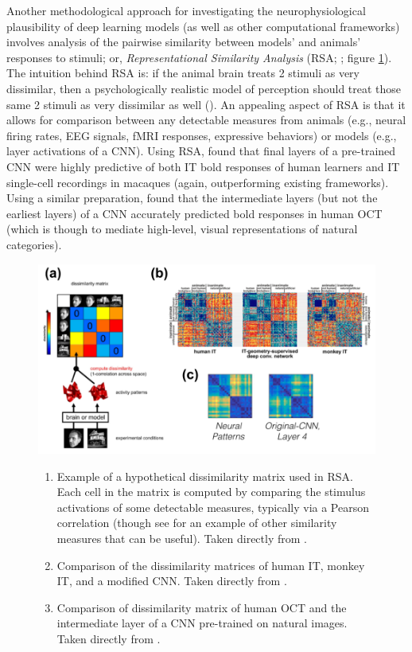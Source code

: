 \documentclass[12pt]{article}
\let\oldcite=\cite
\let\oldtextcite=\textcite
\renewcommand{\cite}[1]{\textcolor[rgb]{0, .121, .388}{\oldcite{#1}}}
\renewcommand{\textcite}[1]{\textcolor[rgb]{0, .121, .388}{\oldtextcite{#1}}}
\begin{document}
Another methodological approach for investigating the neurophysiological plausibility of deep learning models (as well as other computational frameworks) involves analysis of the pairwise similarity between models' and animals' responses to stimuli; or, \emph{Representational Similarity Analysis} (RSA; \cite{kriegeskorte2008representational}; figure \ref{fig:RSA}). The intuition behind RSA is: if the animal brain treats 2 stimuli as very dissimilar, then a psychologically realistic model of perception should treat those same 2 stimuli as very dissimilar as well (\cite{kietzmann2018deep}). An appealing aspect of RSA is that it allows for comparison between any detectable measures from animals (e.g., neural firing rates, EEG signals, fMRI responses, expressive behaviors) or models (e.g., layer activations of a CNN). Using RSA, \textcite{khaligh2014deep} found that final layers of a pre-trained CNN were highly predictive of both IT bold responses of human learners and IT single-cell recordings in macaques (again, outperforming existing frameworks). Using a similar preparation, \textcite{long2018mid} found that the intermediate layers (but not the earliest layers) of a CNN accurately predicted bold responses in human OCT (which is though to mediate high-level, visual representations of natural categories). 

\begin{figure}[!h]
    \centering
    \includegraphics[scale=.4]{figures/RSA.png}
    \caption{}
        \begin{enumerate}[label=(\alph*)]
            \item Example of a hypothetical dissimilarity matrix used in RSA. Each cell in the matrix is computed by comparing the stimulus activations of some detectable measures, typically via a Pearson correlation (though see \cite{bobadilla2019measures} for an example of other similarity measures that can be useful). Taken directly from \textcite{kriegeskorte2008representational}. 
            \item Comparison of the dissimilarity matrices of human IT, monkey IT, and a modified CNN. Taken directly from \textcite{khaligh2014deep,kietzmann2018deep}. 
            \item Comparison of dissimilarity matrix of human OCT and the intermediate layer of a CNN pre-trained on natural images. Taken directly from \textcite{long2018mid}.
        \end{enumerate}
    \label{fig:RSA}
\end{figure} 
\end{document}
